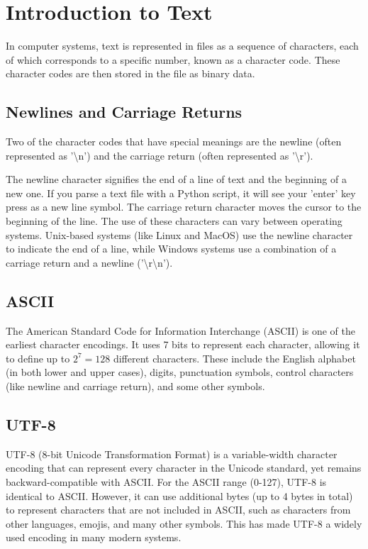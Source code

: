 \chapter{Introduction to Text}


In computer systems, text is represented in files as a sequence of
characters, each of which corresponds to a specific number, known as a
character code. These character codes are then stored in the file as
binary data.

\section{Newlines and Carriage Returns}

Two of the character codes that have special meanings are the newline
(often represented as '\textbackslash n') and the carriage return
(often represented as '\textbackslash r').

The newline character signifies the end of a line of text and the
beginning of a new one. If you parse a text file with a Python script, it will see your 'enter' key press as a new line symbol. 
The carriage return character moves the cursor
to the beginning of the line. The use of these characters can vary
between operating systems. Unix-based systems (like Linux and MacOS)
use the newline character to indicate the end of a line, while Windows
systems use a combination of a carriage return and a newline
('\textbackslash r\textbackslash n').

\section{ASCII}

The American Standard Code for Information Interchange (ASCII) is one
of the earliest character encodings. It uses 7 bits to represent each
character, allowing it to define up to $2^7 = 128$ different
characters. These include the English alphabet (in both lower and
upper cases), digits, punctuation symbols, control characters (like
newline and carriage return), and some other symbols.

\section{UTF-8}

UTF-8 (8-bit Unicode Transformation Format) is a variable-width
character encoding that can represent every character in the Unicode
standard, yet remains backward-compatible with ASCII. For the ASCII
range (0-127), UTF-8 is identical to ASCII. However, it can use additional
bytes (up to 4 bytes in total) to represent characters that are not
included in ASCII, such as characters from other languages, emojis,
and many other symbols. This has made UTF-8 a widely used encoding in
many modern systems.

